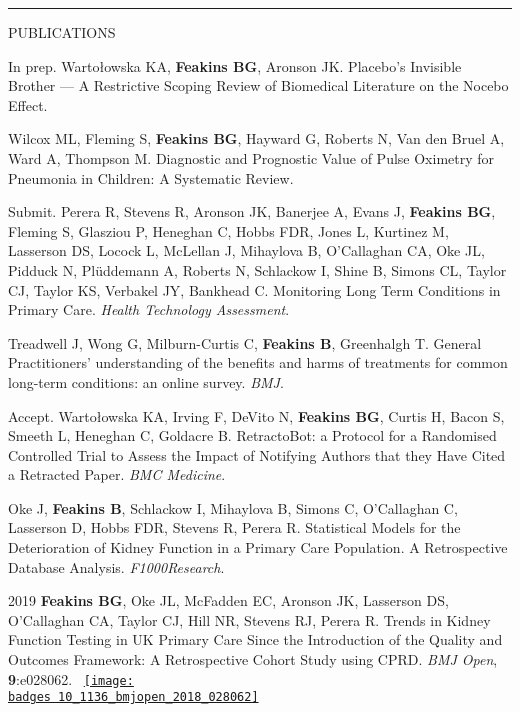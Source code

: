 \documentclass[10pt,a4paper]{article}
\def\badges{./badges/}
\begin{document}
\noindent\rule{\textwidth}{0.4pt}
\begin{cvlist}{PUBLICATIONS}
  
  \item[In prep.]
  Warto\l{}owska KA, \textbf{Feakins BG}, Aronson JK. Placebo’s Invisible Brother --- A Restrictive Scoping Review of Biomedical Literature on the Nocebo Effect.
  
  \item[]
  Wilcox ML, Fleming S, \textbf{Feakins BG}, Hayward G, Roberts N, Van den Bruel A, Ward A, Thompson M. Diagnostic and Prognostic Value of Pulse Oximetry for Pneumonia in Children: A Systematic Review.
  
  \item[Submit.]
  Perera R, Stevens R, Aronson JK, Banerjee A, Evans J, \textbf{Feakins BG}, Fleming S, Glasziou P, Heneghan C, Hobbs FDR, Jones L, Kurtinez M, Lasserson DS, Locock L, McLellan J, Mihaylova B, O'Callaghan CA, Oke JL, Pidduck N, Pl\"uddemann A, Roberts N, Schlackow I, Shine B, Simons CL, Taylor CJ, Taylor KS, Verbakel JY, Bankhead C. Monitoring Long Term Conditions in Primary Care. \textit{Health Technology Assessment}.
  
  \item[]
  Treadwell J, Wong G, Milburn-Curtis C, \textbf{Feakins B}, Greenhalgh T. General Practitioners' understanding of the benefits and harms of treatments for common long-term conditions: an online survey. \textit{BMJ}.
  
  \item[Accept.]
  Warto\l{}owska KA, Irving F, DeVito N, \textbf{Feakins BG}, Curtis H, Bacon S, Smeeth L, Heneghan C, Goldacre B. RetractoBot: a Protocol for a Randomised Controlled Trial to Assess the Impact of Notifying Authors that they Have Cited a Retracted Paper. \textit{BMC Medicine}. 
  
  \item[]
  Oke J, \textbf{Feakins B}, Schlackow I, Mihaylova B, Simons C, O'Callaghan C, Lasserson D, Hobbs FDR, Stevens R, Perera R. Statistical Models for the Deterioration of Kidney Function in a Primary Care Population. A Retrospective Database Analysis. \textit{F1000Research}.
  
  \item[2019]
  \textbf{Feakins BG}, Oke JL, McFadden EC, Aronson JK, Lasserson DS, O'Callaghan CA, Taylor CJ, Hill NR, Stevens RJ, Perera R. Trends in Kidney Function Testing in UK Primary Care Since the Introduction of the Quality and Outcomes Framework: A Retrospective Cohort Study using CPRD. \textit{BMJ Open}, \textbf{9}:e028062. ~\href{https://bmj.altmetric.com/details/62023045}{\texttt{[image: \\badges 10\_1136\_bmjopen\_2018\_028062]}}
  

\end{cvlist}
\end{document}
